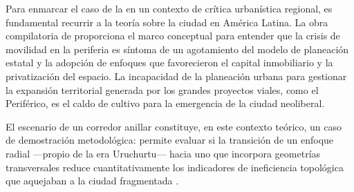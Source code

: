 
\label{sec:teoria-latinoamericana}

Para enmarcar el caso de la \cdmx{} en un contexto de crítica urbanística
regional, es fundamental recurrir a la teoría sobre la ciudad en América Latina.
La obra compilatoria de \citet{padilla2007} proporciona el marco conceptual para
entender que la crisis de movilidad en la periferia es síntoma de un agotamiento
del modelo de planeación estatal y la adopción de enfoques que favorecieron el
capital inmobiliario y la privatización del espacio. La incapacidad de la
planeación urbana para gestionar la expansión territorial generada por los
grandes proyectos viales, como el Periférico, es el caldo de cultivo para la
emergencia de la ciudad neoliberal.

El escenario de un corredor anillar constituye, en este contexto teórico, un
caso de demostración metodológica: permite evaluar si la transición de un
enfoque radial ---propio de la era Uruchurtu--- hacia uno que incorpora
geometrías transversales reduce cuantitativamente los indicadores de
ineficiencia topológica que aquejaban a la ciudad fragmentada
\citep{franco2022}.
